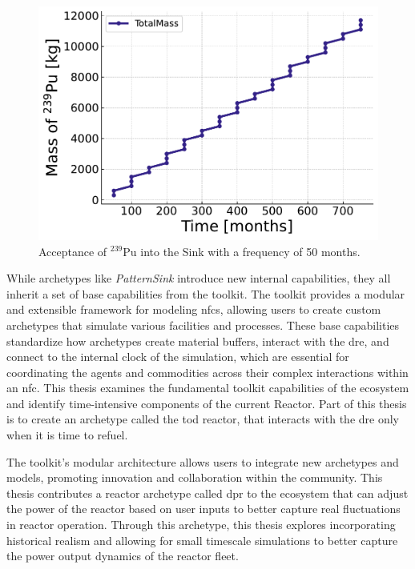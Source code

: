 \begin{figure}[H]
    \centering
    \includegraphics[scale=0.7]{images/cyclus/pattern_sink_fuel_transactions.pdf}
    \caption{Acceptance of $^{239}$Pu into the Sink with a frequency of 50 months.}
    \label{fig:pattern_freq_50}
\end{figure}

While archetypes like \textit{PatternSink} introduce new internal capabilities, they all inherit a set of base capabilities from the \cyclus toolkit. The \cyclus toolkit provides a modular and extensible framework for modeling \glspl{nfc}, allowing users to create custom archetypes that simulate various facilities and processes. These base capabilities standardize how archetypes create material buffers, interact with the \gls{dre}, and connect to the internal clock of the simulation, which are essential for coordinating the agents and commodities across their complex interactions within an \gls{nfc}. This thesis examines the fundamental toolkit capabilities of the \cyclus ecosystem and identify time-intensive components of the current \cycamore Reactor. Part of this thesis is to create an archetype called the \gls{tod} reactor, that interacts with the \gls{dre} only when it is time to refuel.

The toolkit’s modular architecture allows users to integrate new archetypes and models, promoting innovation and collaboration within the \cyclus community. This thesis contributes a reactor archetype called \gls{dpr} to the ecosystem that can adjust the power of the reactor based on user inputs to better capture real fluctuations in reactor operation. Through this archetype, this thesis explores incorporating historical realism and allowing for small timescale simulations to better capture the power output dynamics of the reactor fleet.


